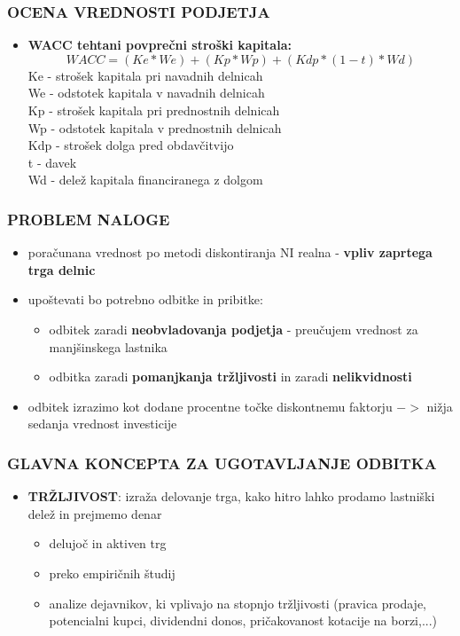 \documentclass{beamer}
\begin{document}
\begin{frame}
\frametitle{OCENA VREDNOSTI PODJETJA}
\begin{itemize}
\item \textbf{WACC tehtani povprečni stroški kapitala: $$WACC=(Ke*We)+(Kp*Wp)+(Kdp*(1-t)*Wd)$$}
 Ke - strošek kapitala pri navadnih delnicah\\
 We - odstotek kapitala v navadnih delnicah\\
 Kp - strošek kapitala pri prednostnih delnicah\\
 Wp - odstotek kapitala v prednostnih delnicah\\
Kdp - strošek dolga pred obdavčitvijo\\
 t - davek\\
 Wd - delež kapitala financiranega z dolgom\\
\end{itemize}
\end{frame}


\begin{frame}
\frametitle{PROBLEM NALOGE}
\begin{itemize}
\item poračunana vrednost po metodi diskontiranja NI realna - \textbf{vpliv zaprtega trga delnic}
\item upoštevati bo potrebno odbitke in pribitke: %
\begin{itemize}
\item odbitek zaradi \textbf{neobvladovanja podjetja} - preučujem vrednost za manjšinskega lastnika
\item odbitka zaradi \textbf{pomanjkanja tržljivosti} in zaradi \textbf{nelikvidnosti}
\end{itemize}
\item odbitek izrazimo kot dodane procentne točke diskontnemu faktorju $->$ nižja sedanja vrednost investicije
\end{itemize}
\end{frame}


\begin{frame}
\frametitle{GLAVNA KONCEPTA ZA UGOTAVLJANJE ODBITKA}
\begin{itemize}
\item \textbf{TRŽLJIVOST}: izraža delovanje trga, kako hitro lahko prodamo lastniški delež in prejmemo denar
\begin{itemize}
\item delujoč in aktiven trg
\item preko empiričnih študij
\item analize dejavnikov, ki vplivajo na stopnjo tržljivosti (pravica prodaje, potencialni kupci, dividendni donos, pričakovanost kotacije na borzi,...)
\end{itemize}
\end{itemize}
\end{frame}
\end{document}
